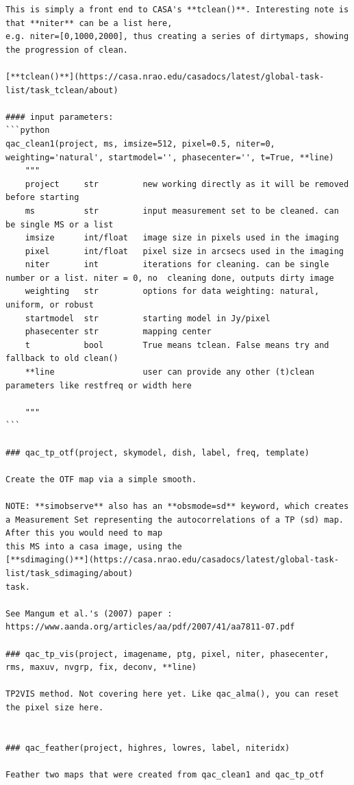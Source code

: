 \documentclass[11pt,twoside]{article}
\begin{document}
\begin{verbatim}
This is simply a front end to CASA's **tclean()**. Interesting note is that **niter** can be a list here,
e.g. niter=[0,1000,2000], thus creating a series of dirtymaps, showing the progression of clean.

[**tclean()**](https://casa.nrao.edu/casadocs/latest/global-task-list/task_tclean/about)

#### input parameters:
```python
qac_clean1(project, ms, imsize=512, pixel=0.5, niter=0, weighting='natural', startmodel='', phasecenter='', t=True, **line)
    """
    project     str         new working directly as it will be removed before starting
    ms          str         input measurement set to be cleaned. can be single MS or a list
    imsize      int/float   image size in pixels used in the imaging
    pixel       int/float   pixel size in arcsecs used in the imaging
    niter       int         iterations for cleaning. can be single number or a list. niter = 0, no  cleaning done, outputs dirty image
    weighting   str         options for data weighting: natural, uniform, or robust
    startmodel  str         starting model in Jy/pixel
    phasecenter str         mapping center
    t           bool        True means tclean. False means try and fallback to old clean()
    **line                  user can provide any other (t)clean parameters like restfreq or width here
    
    """
```

### qac_tp_otf(project, skymodel, dish, label, freq, template)

Create the OTF map via a simple smooth.

NOTE: **simobserve** also has an **obsmode=sd** keyword, which creates
a Measurement Set representing the autocorrelations of a TP (sd) map. After this you would need to map
this MS into a casa image, using the
[**sdimaging()**](https://casa.nrao.edu/casadocs/latest/global-task-list/task_sdimaging/about)
task.

See Mangum et al.'s (2007) paper : https://www.aanda.org/articles/aa/pdf/2007/41/aa7811-07.pdf

### qac_tp_vis(project, imagename, ptg, pixel, niter, phasecenter, rms, maxuv, nvgrp, fix, deconv, **line)

TP2VIS method. Not covering here yet. Like qac_alma(), you can reset the pixel size here.


### qac_feather(project, highres, lowres, label, niteridx)

Feather two maps that were created from qac_clean1 and qac_tp_otf


\end{verbatim}
\end{document}
